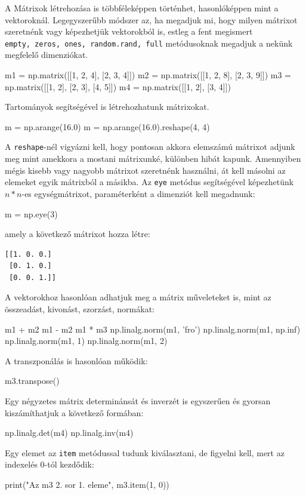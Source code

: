 
A Mátrixok létrehozása is többféleképpen történhet, hasonlóképpen mint a
vektoroknál. Legegyszerűbb módszer az, ha megadjuk mi, hogy milyen
mátrixot szeretnénk vagy képezhetjük vektorokból is, estleg a fent
megismert \texttt{empty,\ zeros,\ ones,\ random.rand,\ full}
metódusoknak megadjuk a nekünk megfelelő dimenziókat.
\begin{python}
m1 = np.matrix([[1, 2, 4], [2, 3, 4]])
m2 = np.matrix([[1, 2, 8], [2, 3, 9]])
m3 = np.matrix([[1, 2], [2, 3], [4, 5]])
m4 = np.matrix([[1, 2], [3, 4]])
\end{python}
Tartományok segítségével is létrehozhatunk mátrixokat.
\begin{python}
m = np.arange(16.0)
m = np.arange(16.0).reshape(4, 4)
\end{python}
    A \texttt{reshape}-nél vigyázni kell, hogy pontosan akkora elemszámú
mátrixot adjunk meg mint amekkora a mostani mátrixunké, különben hibát
kapunk. Amennyiben mégis kisebb vagy nagyobb mátrixot szeretnénk használni, át kell másolni az elemeket egyik mátrixból a másikba.
    Az \texttt{eye} metódus segítségével képezhetünk \(n*n\)-es
egységmátrixot, paraméterként a dimenziót kell megadnunk:
\begin{python}
m = np.eye(3)
\end{python}
amely a következő mátrixot hozza létre:
\begin{verbatim}
[[1. 0. 0.]
 [0. 1. 0.]
 [0. 0. 1.]]
\end{verbatim}
    A vektorokhoz hasonlóan adhatjuk meg a mátrix műveleteket is, mint az
összeadást, kivonást, szorzást, normákat:
\begin{python}
m1 + m2
m1 - m2
m1 * m3
np.linalg.norm(m1, 'fro')
np.linalg.norm(m1, np.inf)
np.linalg.norm(m1, 1)
np.linalg.norm(m1, 2)
\end{python}
A transzponálás is hasonlóan működik:
\begin{python}
m3.transpose()
\end{python}
    Egy négyzetes mátrix determinánsát és inverzét is egyszerűen és gyorsan
kiszámíthatjuk a következő formában:
\begin{python}
np.linalg.det(m4)
np.linalg.inv(m4)
\end{python}
    Egy elemet az \texttt{item} metódussal tudunk kiválasztani, de figyelni
kell, mert az indexelés 0-tól kezdődik:
\begin{python}
print("Az m3 2. sor 1. eleme", m3.item(1, 0))
\end{python}
